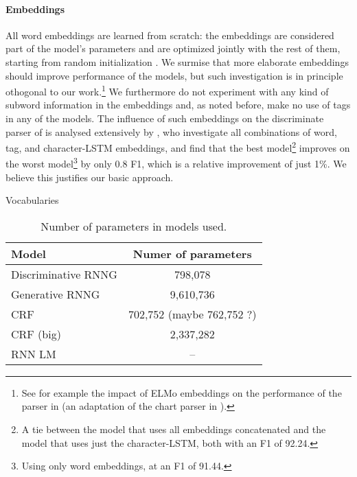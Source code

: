     \paragraph{Embeddings}
    \label{sec:impl-embedding}
    All word embeddings are learned from scratch: the embeddings are considered part of the model's parameters and are optimized jointly with the rest of them, starting from random initialization \citep{glorot2010understanding}. We surmise that more elaborate embeddings should improve performance of the models, but such investigation is in principle othogonal to our work.\footnote{See for example the impact of ELMo embeddings \citep{peters2018elmo} on the performance of the parser in \citet{kitaev2018attentive} (an adaptation of the chart parser in \citet{stern2017minimal}).} We furthermore do not experiment with any kind of subword information in the embeddings and, as noted before, make no use of tags in any of the models. The influence of such embeddings on the discriminate parser of \citet{stern2017minimal} is analysed extensively by \citet{stern2018analyis}, who investigate all combinations of word, tag, and character-LSTM embeddings, and find that the best model\footnote{A tie between the model that uses all embeddings concatenated and the model that uses just the character-LSTM, both with an F1 of 92.24.} improves on the worst model\footnote{Using only word embeddings, at an F1 of 91.44.} by only 0.8 F1, which is a relative improvement of just 1\%. We believe this justifies our basic approach.

    \begin{table}
      \caption{Vocabularies}
      \label{tab:vocabularies}
    \end{table}

    \begin{table}[h]
    \center
      \begin{tabular}{l|c}
          Model  & Numer of parameters \\ \hline
          Discriminative RNNG & 798,078  \\
          Generative RNNG & 9,610,736  \\
          CRF & 702,752 (maybe 762,752 ?)  \\
          CRF (big) & 2,337,282  \\
          RNN LM & -- \\
      \end{tabular}
      \caption{Number of parameters in models used.}
      \label{tab:num-params}
    \end{table}


